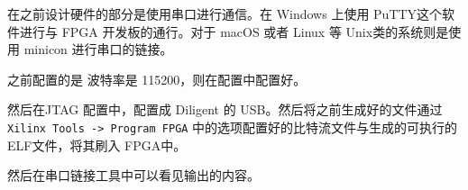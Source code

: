 \documentclass{ctexart}
\begin{document}
        在之前设计硬件的部分是使用串口进行通信。在 Windows 上使用
        PuTTY这个软件进行与 FPGA 开发板的通行。对于 macOS 或者 Linux
        等 Unix类的系统则是使用 minicon 进行串口的链接。
        
        之前配置的是 波特率是 115200，则在配置中配置好。
        
        然后在JTAG 配置中，配置成 Diligent 的 USB。然后将之前生成好的文件通过
        \verb|Xilinx Tools -> Program FPGA|  中的选项配置好的比特流文件与生成的可执行的ELF文件，将其刷入 FPGA中。

        然后在串口链接工具中可以看见输出的内容。


        
\end{document}
